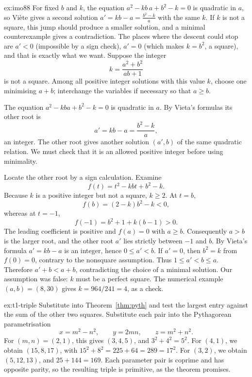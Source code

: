\begin{solution}{ex:imo88}
\idea For fixed $b$ and $k$, the equation $a^2-kb\,a+b^2-k=0$ is quadratic in $a$, so Vi\`ete gives a second solution $a'=kb-a=\frac{b^2-k}a$ with the same $k$. If $k$ is not a square, this jump should produce a smaller solution, and a minimal counterexample gives a contradiction. The places where the descent could stop are $a'<0$ (impossible by a sign check), $a'=0$ (which makes $k=b^2$, a square), and that is exactly what we want.
\writeup Suppose the integer
\[
k=\frac{a^2+b^2}{ab+1}
\]
is not a square. Among all positive integer solutions with this value $k$, choose one minimising $a+b$; interchange the variables if necessary so that $a\ge b$.

The equation $a^2-kba+b^2-k=0$ is quadratic in $a$. By Vieta's formulas its other root is
\[
a'=kb-a=\frac{b^2-k}{a},
\]
an integer. The other root gives another solution $(a',b)$ of the same quadratic relation. We must check that it is an allowed positive integer before using minimality.

Locate the other root by a sign calculation. Examine
\[
f(t)=t^2-kbt+b^2-k.
\]
Because $k$ is a positive integer but not a square, $k\ge2$.
At $t=b$,
\[
f(b)=(2-k)b^2-k<0,
\]
whereas at $t=-1$,
\[
f(-1)=b^2+1+k(b-1)>0.
\]
The leading coefficient is positive and $f(a)=0$ with $a\ge b$.
Consequently $a>b$ is the larger root, and the other
root $a'$ lies strictly between $-1$ and $b$.
By Vieta's formula $a'=kb-a$ is an integer, hence
$0\le a'<b$. If $a'=0$, then $b^2=k$ from $f(0)=0$,
contrary to the nonsquare assumption. Thus
$1\le a'<b\le a$. Therefore $a'+b<a+b$, contradicting the choice of a minimal solution. Our assumption was false: $k$ must be a perfect square. The numerical example $(a,b)=(8,30)$ gives $k=964/241=4$, as a check.
\end{solution}

\begin{solution}{ex:t1-triple}
\idea Substitute into Theorem~\ref{thm:pyth} and test the largest entry against the sum of the other two squares.
\writeup Substitute each pair into the Pythagorean parametrisation
\[
x=m^2-n^2,\qquad y=2mn,\qquad z=m^2+n^2.
\]
For $(m,n)=(2,1)$, this gives $(3,4,5)$, and $3^2+4^2=5^2$. For $(4,1)$, we obtain $(15,8,17)$, with $15^2+8^2=225+64=289=17^2$. For $(3,2)$, we obtain $(5,12,13)$, and $25+144=169$. Each parameter pair is coprime and has opposite parity, so the resulting triple is primitive, as the theorem promises.
\end{solution}

